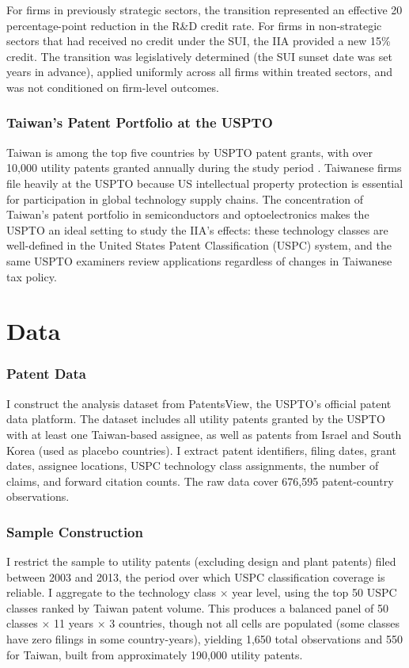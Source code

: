 \documentclass[12pt]{article}
\begin{document}
For firms in previously strategic sectors, the transition represented an effective 20 percentage-point reduction in the R\&D credit rate. For firms in non-strategic sectors that had received no credit under the SUI, the IIA provided a new 15\% credit. The transition was legislatively determined (the SUI sunset date was set years in advance), applied uniformly across all firms within treated sectors, and was not conditioned on firm-level outcomes.

\subsubsection*{Taiwan's Patent Portfolio at the USPTO} Taiwan is among the top five countries by USPTO patent grants, with over 10,000 utility patents granted annually during the study period \citep{wipo2015indicators}. Taiwanese firms file heavily at the USPTO because US intellectual property protection is essential for participation in global technology supply chains. The concentration of Taiwan's patent portfolio in semiconductors and optoelectronics makes the USPTO an ideal setting to study the IIA's effects: these technology classes are well-defined in the United States Patent Classification (USPC) system, and the same USPTO examiners review applications regardless of changes in Taiwanese tax policy.


\section{Data}

\subsubsection*{Patent Data} I construct the analysis dataset from PatentsView, the USPTO's official patent data platform. The dataset includes all utility patents granted by the USPTO with at least one Taiwan-based assignee, as well as patents from Israel and South Korea (used as placebo countries). I extract patent identifiers, filing dates, grant dates, assignee locations, USPC technology class assignments, the number of claims, and forward citation counts. The raw data cover 676,595 patent-country observations.

\subsubsection*{Sample Construction} I restrict the sample to utility patents (excluding design and plant patents) filed between 2003 and 2013, the period over which USPC classification coverage is reliable. I aggregate to the technology class $\times$ year level, using the top 50 USPC classes ranked by Taiwan patent volume. This produces a balanced panel of 50 classes $\times$ 11 years $\times$ 3 countries, though not all cells are populated (some classes have zero filings in some country-years), yielding 1,650 total observations and 550 for Taiwan, built from approximately 190,000 utility patents.
\end{document}
